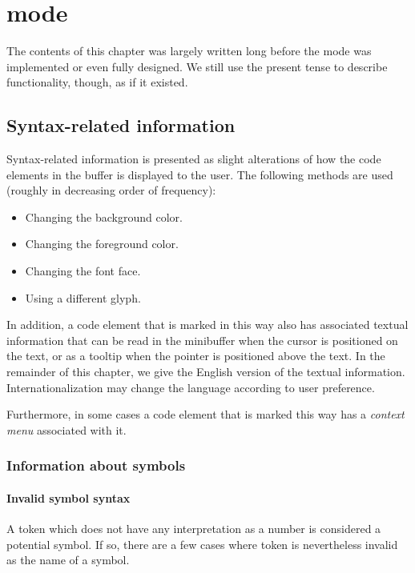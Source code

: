 \chapter{\cl{} mode}

The contents of this chapter was largely written long before the \cl{}
mode was implemented or even fully designed.  We still use the present
tense to describe functionality, though, as if it existed. 

\section{Syntax-related information}

Syntax-related information is presented as slight alterations of how
the code elements in the buffer is displayed to the user.  The
following methods are used (roughly in decreasing order of frequency):

\begin{itemize}
\item Changing the background color.
\item Changing the foreground color.
\item Changing the font face.
\item Using a different glyph.
\end{itemize}

In addition, a code element that is marked in this way also has
associated textual information that can be read in the minibuffer when
the cursor is positioned on the text, or as a tooltip when the pointer
is positioned above the text.  In the remainder of this chapter, we
give the English version of the textual information.
Internationalization may change the language according to user
preference.

Furthermore, in some cases a code element that is marked this way has
a \emph{context menu} associated with it.

\subsection{Information about symbols}

\subsubsection{Invalid symbol syntax}

A token which does not have any interpretation as a number is
considered a potential symbol.  If so, there are a few cases where
token is nevertheless invalid as the name of a symbol.

